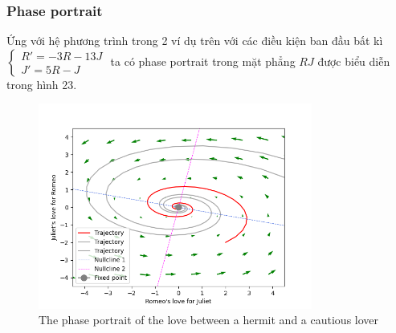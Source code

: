 \subsubsection{Phase portrait}
Ứng với hệ phương trình trong 2 ví dụ trên với các điều kiện ban đầu bất kì
$\begin{cases}
        R'=-3R-13J\\
        J'=5R-J
\end{cases}$
ta có phase portrait trong mặt phẳng $RJ$ được biểu diễn trong hình 23.
\begin{figure}[h!]
    \begin{center}
    \includegraphics[width=9cm]{images/phase_portrait_hermit.png}
    \end{center}
    \caption{The phase portrait of the love between a hermit and a cautious lover}
\end{figure}